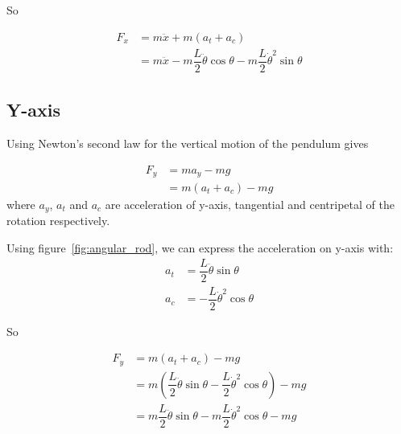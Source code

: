 \documentclass{notes}
\begin{document}
So 

\begin{align}
  F_x  & = m \ddot{x} + m (a_{t} + a_{c}) \nonumber\\
         & = m \ddot{x} -m\dfrac{L}{2} \ddot{\theta} \cos \theta 
                        -m\dfrac{L}{2} \dot{\theta}^2 \sin \theta \label{eqn:f_x}
\end{align}
\FloatBarrier


\subsection{Y-axis}
Using Newton's second law for the vertical motion of the pendulum gives

\begin{align*}
  F_y & = ma_y - mg \\
      & = m(a_t + a_c) - mg
\end{align*}
where $a_y$, $a_t$ and $a_c$ are acceleration of y-axis, tangential and centripetal of the rotation
respectively. 

Using figure~\ref{fig:angular_rod}, we can express the acceleration on y-axis with:
\begin{align*}
  a_t & = \dfrac{L}{2}\ddot{\theta}\sin\theta \\
  a_c & = -\dfrac{L}{2}\dot{\theta}^2\cos\theta
\end{align*}

So

\begin{align}
  F_y & = m(a_t + a_c) - mg \nonumber\\
      & = m(\dfrac{L}{2}\ddot{\theta}\sin\theta - \dfrac{L}{2}\dot{\theta}^2\cos\theta) - mg
      \nonumber\\ 
      & = m\dfrac{L}{2}\ddot{\theta}\sin\theta - m\dfrac{L}{2}\dot{\theta}^2\cos\theta - mg
       \label{eqn:f_y}
\end{align}


 
\end{document}
